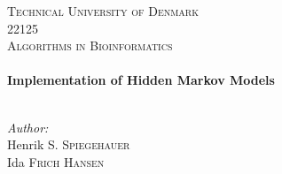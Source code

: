 \begin{titlepage}
\fontsize{10pt}{10pt}
\selectfont
\center %


\textsc{\LARGE Technical University of Denmark}\\[1.3cm] %
\textsc{\large 22125 }\\[0.5cm] %
\textsc{\large Algorithms in Bioinformatics }\\[0.9cm] %


\HRule \\[0.6cm]
{ \large \bfseries\LARGE
Implementation of Hidden Markov Models
} \\[0.8cm]  %
\HRule \\ [2cm]
 
\begin{minipage}{0.6\textwidth}
\begin{flushleft} \large
\emph{Author:}\\
 Henrik \textsc{S. Spiegehauer} \tab{}\\
 Ida \textsc{Frich Hansen} \\
\end{flushleft}
\end{minipage}





\end{titlepage}
